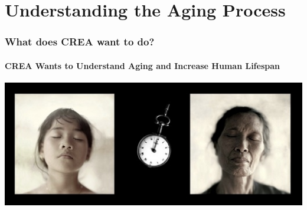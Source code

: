 \documentclass[mathserif, aspectratio=169]{beamer}
\begin{document}
\section{Understanding the Aging Process}


\begin{frame}

\frametitle{What does CREA want to do?}
\framesubtitle{CREA Wants to Understand Aging and Increase Human Lifespan}

\centering

\includegraphics[height=.5\textheight]{images/aging}

\end{frame}

\end{document}
